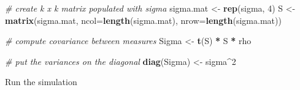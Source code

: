 \documentclass[]{book}
\newenvironment{Shaded}{\begin{snugshade}}{\end{snugshade}}
\newcommand{\CommentTok}[1]{\textcolor[rgb]{0.56,0.35,0.01}{\textit{#1}}}
\newcommand{\DataTypeTok}[1]{\textcolor[rgb]{0.13,0.29,0.53}{#1}}
\newcommand{\DecValTok}[1]{\textcolor[rgb]{0.00,0.00,0.81}{#1}}
\newcommand{\KeywordTok}[1]{\textcolor[rgb]{0.13,0.29,0.53}{\textbf{#1}}}
\newcommand{\NormalTok}[1]{#1}
\newcommand{\OperatorTok}[1]{\textcolor[rgb]{0.81,0.36,0.00}{\textbf{#1}}}
\newcommand{\StringTok}[1]{\textcolor[rgb]{0.31,0.60,0.02}{#1}}
\begin{document}
\begin{Shaded}
\begin{Highlighting}[]
\CommentTok{# create k x k matrix populated with sigma}
\NormalTok{sigma.mat <-}\StringTok{ }\KeywordTok{rep}\NormalTok{(sigma, }\DecValTok{4}\NormalTok{)}
\NormalTok{S <-}\StringTok{ }\KeywordTok{matrix}\NormalTok{(sigma.mat, }\DataTypeTok{ncol=}\KeywordTok{length}\NormalTok{(sigma.mat), }\DataTypeTok{nrow=}\KeywordTok{length}\NormalTok{(sigma.mat))}
 
\CommentTok{# compute covariance between measures}
\NormalTok{Sigma <-}\StringTok{ }\KeywordTok{t}\NormalTok{(S) }\OperatorTok{*}\StringTok{ }\NormalTok{S }\OperatorTok{*}\StringTok{ }\NormalTok{rho  }
 
\CommentTok{# put the variances on the diagonal }
\KeywordTok{diag}\NormalTok{(Sigma) <-}\StringTok{ }\NormalTok{sigma}\OperatorTok{^}\DecValTok{2}  
\end{Highlighting}
\end{Shaded}

Run the simulation
\end{document}
